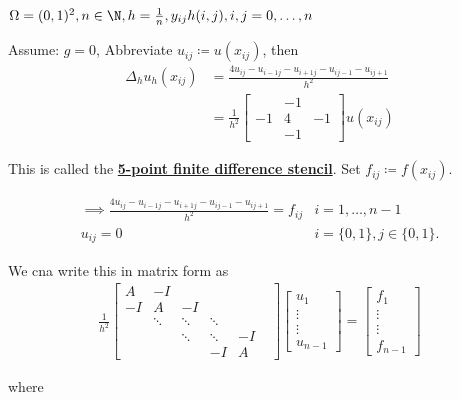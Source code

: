 \begin{example}
    $\Omega=(0,1)^2,n\in\N,h=\frac{1}{n},y_{ij}h(i,j),i,j=0,\dots,n$

    Assume: $g=0$, Abbreviate $u_{ij}\coloneqq u(x_{ij})$, then 
\begin{align*}
    \Delta_hu_h(x_{ij})&=\frac{4u_{ij}-u_{i-1j}-u_{i+1j}-u_{ij-1}-u_{ij+1}}{h^2}\\
    &=\frac{1}{h^2}\begin{bmatrix}
        &-1 &\\
        -1 & 4 & -1\\
        & -1 &
    \end{bmatrix}u(x_{ij})
\end{align*}

This is called the \underline{\textbf{5-point finite difference stencil}}. Set $f_{ij}\coloneqq f(x_{ij})$.

\begin{align*}
    \implies \frac{4u_{ij}-u_{i-1j}-u_{i+1j}-u_{ij-1}-u_{ij+1}}{h^2} = f_{ij}& i=1,\dots, n-1\\
    u_{ij}=0 & i=\{0,1\}, j\in \{0,1\}.
\end{align*}

We cna write this in matrix form as 
\begin{align*}
    \frac{1}{h^2}\begin{bmatrix}
        A  & -I &  &  &&\\
        -I & A & -I &  & & \\
        & \ddots & \ddots & \ddots &&\\
        &&\ddots &\ddots & -I\\
        &&&-I&A
    \end{bmatrix}\begin{bmatrix}
        u_1\\
        \vdots\\
        \vdots\\
        u_{n-1}
    \end{bmatrix}=\begin{bmatrix}
        f_1\\
        \vdots\\
        \vdots\\
        f_{n-1}
    \end{bmatrix}
\end{align*}

where 


\end{example}
